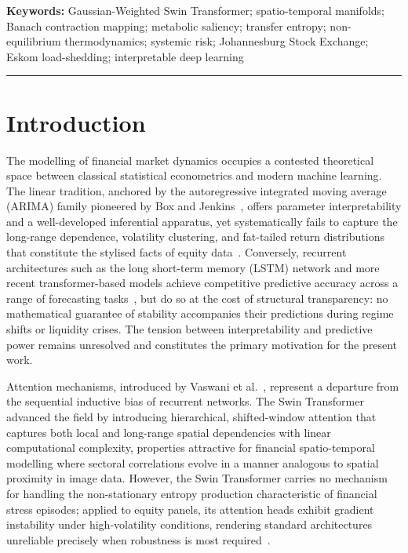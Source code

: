 \documentclass[11pt,a4paper]{article}  %
\theoremstyle{plain}
\theoremstyle{definition}
\theoremstyle{remark}
\begin{document}
\noindent\textbf{Keywords:} Gaussian-Weighted Swin Transformer;
spatio-temporal manifolds; Banach contraction mapping; metabolic
saliency; transfer entropy; non-equilibrium thermodynamics; systemic
risk; Johannesburg Stock Exchange; Eskom load-shedding; interpretable
deep learning

\vspace{0.5em}
\noindent\rule{\linewidth}{0.4pt}
\vspace{0.5em}

\section{Introduction}
\label{sec:intro}

The modelling of financial market dynamics occupies a contested
theoretical space between classical statistical econometrics and
modern machine learning. The linear tradition, anchored by the
autoregressive integrated moving average (ARIMA) family pioneered
by Box and Jenkins~\cite{BoxJenkins1970}, offers parameter
interpretability and a well-developed inferential apparatus, yet
systematically fails to capture the long-range dependence,
volatility clustering, and fat-tailed return distributions that
constitute the stylised facts of equity data~\cite{Cont2001}.
Conversely, recurrent architectures such as the long short-term
memory (LSTM) network and more recent transformer-based models
achieve competitive predictive accuracy across a range of
forecasting tasks~\cite{Hochreiter1997,Zhou2021}, but do so at the
cost of structural transparency: no mathematical guarantee of
stability accompanies their predictions during regime shifts or
liquidity crises. The tension between interpretability and predictive
power remains unresolved and constitutes the primary motivation for
the present work.

Attention mechanisms, introduced by Vaswani et al.~\cite{Vaswani2017},
represent a departure from the sequential inductive bias of recurrent
networks. The Swin Transformer~\cite{Liu2021} advanced the field by
introducing hierarchical, shifted-window attention that captures both
local and long-range spatial dependencies with linear computational
complexity, properties attractive for financial spatio-temporal
modelling where sectoral correlations evolve in a manner analogous to
spatial proximity in image data. However, the Swin Transformer carries
no mechanism for handling the non-stationary entropy production
characteristic of financial stress episodes; applied to equity panels,
its attention heads exhibit gradient instability under high-volatility
conditions, rendering standard architectures unreliable precisely when
robustness is most required~\cite{Dehghani2023}.
\end{document}
